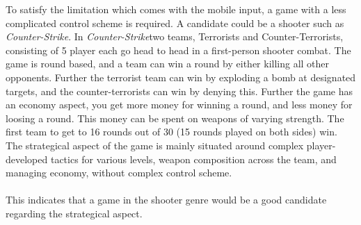To satisfy the limitation which comes with the mobile input, a game with a less complicated control scheme is required.
A candidate could be a shooter such as \textit{Counter-Strike}.
In \textit{Counter-Strike}two teams, Terrorists and Counter-Terrorists, consisting of 5 player each go head to head in a first-person shooter combat. The game is round based, and a team can win a round by either killing all other opponents. Further the terrorist team can win by exploding a bomb at designated targets, and the counter-terrorists can win by denying this. Further the game has an economy aspect, you get more money for winning a round, and less money for loosing a round. This money can be spent on weapons of varying strength. 
The first team to get to 16 rounds out of 30 (15 rounds played on both sides) win. 
The strategical aspect of the game is mainly situated around complex player-developed tactics for various levels, weapon composition across the team, and managing economy, without complex control scheme.\\\\
This indicates that a game in the shooter genre would be a good candidate regarding the strategical aspect.

